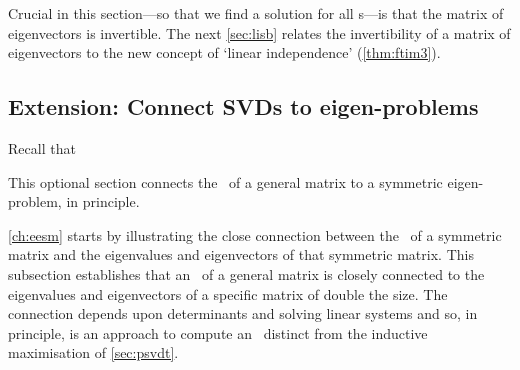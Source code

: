 Crucial in this section---so that we find a solution for all s---is that the matrix of eigenvectors is invertible.
The next \autoref{sec:lisb} relates the invertibility of a matrix of eigenvectors to the new concept of `linear independence' (\autoref{thm:ftim3}).
















\subsection{Extension: Connect SVDs to eigen-problems}

Recall that 
\begin{aside}
This optional section connects the \svd\ of a general matrix to a symmetric eigen-problem, in principle.
\end{aside}%
\autoref{ch:eesm} starts by illustrating the close connection between the \svd\ of a symmetric matrix and the eigenvalues and eigenvectors of that symmetric matrix.
This subsection establishes that an \svd\ of a general matrix is closely connected to the eigenvalues and eigenvectors of a specific matrix of double the size.   
The connection depends upon determinants and solving linear systems and so, in principle, is an approach to compute an \svd\ distinct from the inductive maximisation of \autoref{sec:psvdt}.



